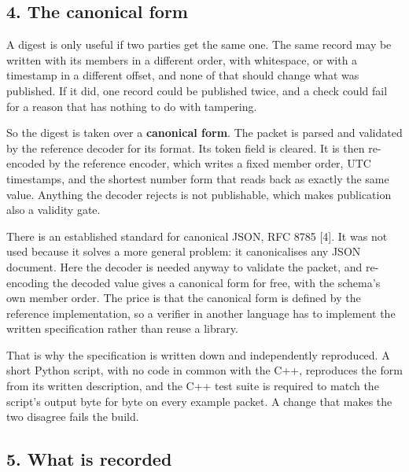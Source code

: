 \documentclass[
  12pt,
  letterpaper,
]{article}
\begin{document}
\hypertarget{the-canonical-form}{%
\subsection{4. The canonical form}\label{the-canonical-form}}

A digest is only useful if two parties get the same one. The same record
may be written with its members in a different order, with whitespace,
or with a timestamp in a different offset, and none of that should
change what was published. If it did, one record could be published
twice, and a check could fail for a reason that has nothing to do with
tampering.

So the digest is taken over a \textbf{canonical form}. The packet is
parsed and validated by the reference decoder for its format. Its token
field is cleared. It is then re-encoded by the reference encoder, which
writes a fixed member order, UTC timestamps, and the shortest number
form that reads back as exactly the same value. Anything the decoder
rejects is not publishable, which makes publication also a validity
gate.

There is an established standard for canonical JSON, RFC 8785 {[}4{]}.
It was not used because it solves a more general problem: it
canonicalises any JSON document. Here the decoder is needed anyway to
validate the packet, and re-encoding the decoded value gives a canonical
form for free, with the schema's own member order. The price is that the
canonical form is defined by the reference implementation, so a verifier
in another language has to implement the written specification rather
than reuse a library.

That is why the specification is written down and independently
reproduced. A short Python script, with no code in common with the C++,
reproduces the form from its written description, and the C++ test suite
is required to match the script's output byte for byte on every example
packet. A change that makes the two disagree fails the build.

\hypertarget{what-is-recorded}{%
\subsection{5. What is recorded}\label{what-is-recorded}}
\end{document}
